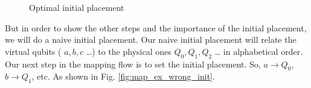 \begin{figure}[H]
{{
 }
\label{fig:map_ex_chip_optim}
}

\label{fig:optimal_init_place}
\caption{Optimal initial placement}
\end{figure}
But in order to show the other steps and the importance of the initial placement, we will do a naive initial placement.
Our naive initial placement will relate the virtual qubits ( \(a, b, c\) \ldots{}) to the physical ones \(Q_0, Q_1, Q_2\) \ldots{} in alphabetical order.
Our next step in the mapping flow is to set the initial placement.
So, \(a \to Q_0\), \(b \to Q_1\), etc.
As shown in Fig. \ref{fig:map_ex_wrong_init}.



